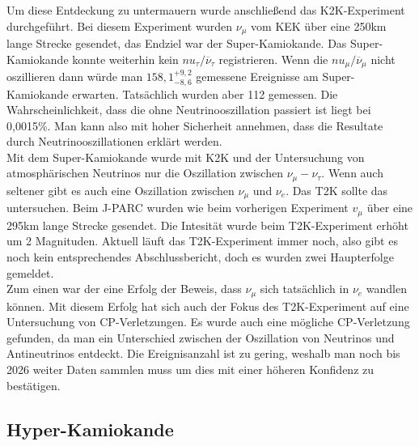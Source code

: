 Um diese Entdeckung zu untermauern wurde anschließend das K2K-Experiment durchgeführt. Bei diesem Experiment
wurden $\nu_\mu$ vom KEK über eine 250km lange Strecke gesendet, das Endziel war der Super-Kamiokande. 
Das Super-Kamiokande konnte weiterhin kein $nu_\tau/\overline{\nu}_\tau$ registrieren. \cite{Collaboration2002}
Wenn die $nu_\mu/\overline{\nu}_\mu$ nicht oszillieren dann würde man $158,1^{+9,2}_{-8,6}$ gemessene Ereignisse 
am Super-Kamiokande erwarten. Tatsächlich wurden aber 112 gemessen. Die Wahrscheinlichkeit, dass die 
ohne Neutrinooszillation passiert ist liegt bei 0,0015\%. Man kann also mit hoher Sicherheit annehmen, 
dass die Resultate durch Neutrinooszillationen erklärt werden. \cite{Ahn2006}\\
Mit dem Super-Kamiokande wurde mit K2K und der Untersuchung von atmosphärischen Neutrinos nur die Oszillation
zwischen $\nu_\mu - \nu_\tau$. Wenn auch seltener gibt es auch eine Oszillation zwischen $\nu_\mu$ und 
$\nu_e$. Das T2K sollte das untersuchen. Beim J-PARC wurden wie beim vorherigen Experiment $v_\mu$ über 
eine 295km lange Strecke gesendet. Die Intesität wurde beim T2K-Experiment erhöht um 2 Magnituden.\cite{Yuichi2006}
Aktuell läuft das T2K-Experiment immer noch, also gibt es noch kein entsprechendes Abschlussbericht, doch
es wurden zwei Haupterfolge gemeldet. \\
Zum einen war der eine Erfolg der Beweis, dass $\nu_\mu$ sich tatsächlich in $\nu_e$ wandlen können. Mit diesem Erfolg
hat sich auch der Fokus des T2K-Experiment auf eine Untersuchung von CP-Verletzungen. \cite{T2K2017}
Es wurde auch eine mögliche CP-Verletzung gefunden, da man ein Unterschied zwischen der Oszillation von Neutrinos
und Antineutrinos entdeckt. Die Ereignisanzahl ist zu gering, weshalb man noch bis 2026 weiter Daten sammlen muss
um dies mit einer höheren Konfidenz zu bestätigen. \cite{T2K2013} 

\subsection{Hyper-Kamiokande}

